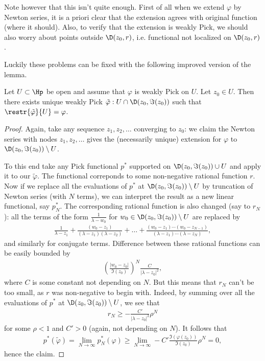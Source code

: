Note however that this isn't quite enough. First of all when we extend $\varphi$ by Newton series, it is a priori clear that the extension agrees with original function (where it should). Also, to verify that the extension is weakly Pick, we should also worry about points outside $\D(z_{0}, r)$, i.e. functional not localized on $\D(z_{0}, r)$.

Luckily these problems can be fixed with the following improved version of the lemma.

\begin{lem}\label{open_pick_lemma}
	Let $U \subset \Hp$ be open and assume that $\varphi$ is weakly Pick on $U$. Let $z_{0} \in U$. Then there exists unique weakly Pick $\tilde{\varphi} : U \cap \D(z_{0}, \Im(z_{0}))$ such that $\restr{\tilde{\varphi}}{U} = \varphi$.
\end{lem}

\begin{proof}
	Again, take any sequence $z_{1}, z_{2}, \ldots$ converging to $z_{0}$: we claim the Newton series with nodes $z_{1}, z_{2}, \ldots$ gives the (necessarily unique) extension for $\varphi$ to $\D(z_{0}, \Im(z_{0})) \setminus U$.

	To this end take any Pick functional $p^{*}$ supported on  $\D(z_{0}, \Im(z_{0})) \cup U$ and apply it to our $\tilde{\varphi}$. The functional correponds to some non-negative rational function $r$. Now if we replace all the evaluations of $p^{*}$ at $\D(z_{0}, \Im(z_{0})) \setminus U$ by truncation of Newton series (with $N$ terms), we can interpret the result as a new linear functional, say $p^{*}_{N}$. The corresponding rational function is also changed (say to $r_{N}$): all the terms of the form $\frac{1}{\lambda - w_{0}}$ for $w_{0} \in \D(z_{0}, \Im(z_{0})) \setminus U$ are replaced by
	\begin{align*}
		\frac{1}{\lambda - z_{1}} + \frac{(w_{0} - z_{1})}{(\lambda - z_{1}) (\lambda - z_{2})} + \ldots + \frac{(w_{0} - z_{1})\cdots (w_{0} - z_{N - 1})}{(\lambda - z_{1})\cdots (\lambda - z_{N})},
	\end{align*}
	and similarly for conjugate terms. Difference between these rational functions can be easily bounded by
	\begin{align*}
		\left(\frac{|w_{0} - z_{0}|}{\Im(z_{0})}\right)^{N}\frac{C}{|\lambda - z_{0}|^2},
	\end{align*}
	where $C$ is some constant not depending on $N$. But this means that $r_{N}$ can't be too small, as $r$ was non-negative to begin with. Indeed, by summing over all the evaluations of $p^{*}$ at $\D(z_{0}, \Im(z_{0})) \setminus U$, we see that
	\begin{align*}
		r_{N} \geq -\frac{C'}{|\lambda - z_{0}|^2} \rho^{N}
	\end{align*}
	for some $\rho < 1$ and $C' > 0$ (again, not depending on $N$). It follows that
	\begin{align*}
		p^{*}(\tilde{\varphi}) = \lim_{N \to \infty} p^{*}_{N}(\varphi) \geq \lim_{N \to \infty} -C' \frac{\Im(\varphi(z_{0}))}{\Im(z_{0})} \rho^{N} = 0,
	\end{align*}
	hence the claim.
\end{proof}


